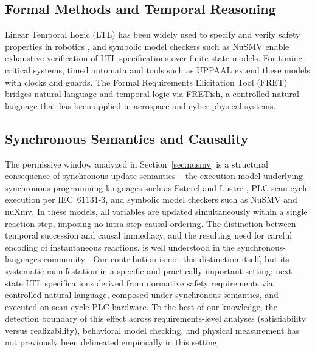\documentclass{ieeeaccess}
\theoremstyle{definition}
\begin{document}
\subsection{Formal Methods and Temporal Reasoning}
Linear Temporal Logic (LTL) has been widely used to specify and verify safety properties in robotics \cite{KressGazit2009}, and symbolic model checkers such as NuSMV \cite{Cimatti2002NuSMV} enable exhaustive verification of LTL specifications over finite-state models. For timing-critical systems, timed automata and tools such as UPPAAL \cite{Behrmann2006UPPAAL} extend these models with clocks and guards. The Formal Requirements Elicitation Tool (FRET) \cite{Giannakopoulou2018FRET,Giannakopoulou2019FRET} bridges natural language and temporal logic via FRETish, a controlled natural language that has been applied in aerospace and cyber-physical systems.

\subsection{Synchronous Semantics and Causality}
The permissive window analyzed in Section~\ref{sec:nusmv} is a structural consequence of synchronous update semantics -- the execution model underlying synchronous programming languages such as Esterel \cite{Esterel} and Lustre \cite{Halbwachs}, PLC scan-cycle execution per IEC~61131-3, and symbolic model checkers such as NuSMV and nuXmv. In these models, all variables are updated simultaneously within a single reaction step, imposing no intra-step causal ordering. The distinction between temporal succession and causal immediacy, and the resulting need for careful encoding of instantaneous reactions, is well understood in the synchronous-languages community \cite{Esterel}. Our contribution is not this distinction itself, but its systematic manifestation in a specific and practically important setting: next-state LTL specifications derived from normative safety requirements via controlled natural language, composed under synchronous semantics, and executed on scan-cycle PLC hardware. To the best of our knowledge, the detection boundary of this effect across requirements-level analyses (satisfiability versus realizability), behavioral model checking, and physical measurement has not previously been delineated empirically in this setting.
\end{document}
